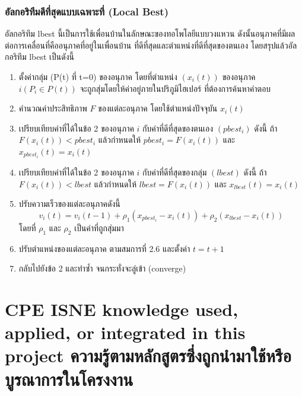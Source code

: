 \subsubsection{อัลกอริทึมดีที่สุดแบบเฉพาะที่ (Local Best)}
อัลกอริทึม lbest \cite{Engelbrecht} นี้เป็นการใช้เพื่อนบ้านในลักษณะของทอโพโลยีแบบวงแหวน ดังนั้นอนุภาคที่มีผลต่อการเคลื่อนที่คืออนุภาคที่อยู่ในเพื่อนบ้าน ที่ดีที่สุดและตำแหน่งที่ดีที่สุดของตนเอง โดยสรุปแล้วอัลกอริทึม lbest เป็นดังนี้
\begin{enumerate}
  \item ตั้งค่ากลุ่ม (P(t) ที่ t=0) ของอนุภาค โดยที่ตำแหน่ง \((x_{i}(t))\) ของอนุภาค \(i (P_{i} \in P(t))\) จะถูกสุ่มโดยให้ค่าอยู่ภายในปริภูมิไฮเปอร์ ที่ต้องการค้นหาคำตอบ
  \item คำนวณค่าประสิทธิภาพ \(F\) ของแต่ละอนุภาค โดยใช้ตำแหน่งปัจจุบัน \(x_{i}(t)\)
  \item เปรียบเทียบค่าที่ได้ในข้อ 2 ของอนุภาค \(i\) กับค่าที่ดีที่สุดของตนเอง \((pbest_{i})\) ดังนี้ ถ้า \(F(x_{i}(t)) < pbest_{i}\) แล้วกำหนดให้ \(pbest_{i} = F(x_{i}(t))\) และ \(x_{pbest_{i}}(t) = x_{i}(t)\)
  \item เปรียบเทียบค่าที่ได้ในข้อ 2 ของอนุภาค \(i\) กับค่าที่ดีที่สุดของกลุ่ม \((lbest)\) ดังนี้ ถ้า \(F(x_{i}(t)) < lbest\) แล้วกำหนดให้ \(lbest = F(x_{i}(t))\) และ \(x_{lbest}(t) = x_{i}(t)\)
  \item ปรับความเร็วของแต่ละอนุภาคดังนี้ \begin{equation}
    v_{i}(t) = v_{i}(t-1) + \rho_{1}(x_{pbest_{i}} - x_{i}(t)) + \rho_{2}(x_{lbest} - x_{i}(t))
  \end{equation} โดยที่ \(\rho_{1}\) และ \(\rho_{2}\) เป็นค่าที่ถูกสุ่มมา
  \item ปรับตำแหน่งของแต่ละอนุภาค ตามสมการที่ 2.6 และตั้งค่า \(t = t+1\)
  \item กลับไปยังข้อ 2 และทำซ้ำ จนกระทั่งจะลู่เข้า (converge)
  \end{enumerate}


\section{\ifenglish%
\ifcpe CPE \else ISNE \fi knowledge used, applied, or integrated in this project
\else%
ความรู้ตามหลักสูตรซึ่งถูกนำมาใช้หรือบูรณาการในโครงงาน
\fi
}

